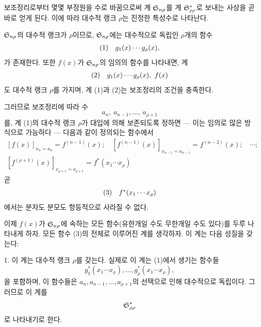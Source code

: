 보조정리로부터 몇몇 부정원을 수로 바꿈으로써 계 $\mathfrak S_{n\rho}$를 계 $\mathfrak S^*_{\rho\rho}$로 보내는 사상을 곧바로 얻게 된다. 이에 따라 대수적 랭크 $\rho$는 진정한 특성수로 나타난다.

$\mathfrak S_{n\rho}$의 대수적 랭크가 $\rho$이므로, $\mathfrak S_{n\rho}$에는 대수적으로 독립인 $\rho$개의 함수
\[
\begin{array}{@{}l@{\quad}c@{}}
(1)& g_1(x)\cdots g_\rho(x),
\end{array}
\]
가 존재한다. 또한 $f(x)$가 $\mathfrak S_{n\rho}$의 임의의 함수를 나타내면, 계
\[
\begin{array}{@{}l@{\quad}c@{}}
(2)& g_1(x)\cdots g_\rho(x),\ f(x)
\end{array}
\]
도 대수적 랭크 $\rho$를 가지며, 계 (1)과 (2)는 보조정리의 조건을 충족한다.

그러므로 보조정리에 따라 수
\[
 a_n,\ a_{n-1},\ldots,\ a_{\rho+1}
\]
를, 계 (1)의 대수적 랭크 $\rho$가 대입에 의해 보존되도록 정하면 --- 이는 임의로 많은 방식으로 가능하다 --- 다음과 같이 정의되는 함수에서
\[
\begin{array}{c}
[f(x)]_{x_n=a_n}=f^{(n-1)}(x);\quad
[f^{(n-1)}(x)]_{x_{n-1}=a_{n-1}}=f^{(n-2)}(x);\quad\cdots;\\[0.25em]
[f^{(\rho+1)}(x)]_{x_{\rho+1}=a_{\rho+1}}=f^*(x_1\cdots x_\rho)
\end{array}
\]
곧
\[
\begin{array}{@{}l@{\quad}c@{}}
(3)& f^*(x_1\cdots x_\rho)
\end{array}
\]
에서는 분자도 분모도 항등적으로 사라질 수 없다.

이제 $f(x)$가 $\mathfrak S_{n\rho}$에 속하는 모든 함수(유한개일 수도 무한개일 수도 있다)를 두루 나타내게 하자. 모든 함수 (3)의 전체로 이루어진 계를 생각하자. 이 계는 다음 성질을 갖는다:

1. 이 계는 대수적 랭크 $\rho$를 갖는다. 실제로 이 계는 (1)에서 생기는 함수들
\[
g_1^*(x_1\cdots x_\rho),\ldots,g_\rho^*(x_1\cdots x_\rho),
\]
을 포함하며, 이 함수들은 $a_n,a_{n-1},\ldots,a_{\rho+1}$의 선택으로 인해 대수적으로 독립이다. 그러므로 이 계를
\[
\mathfrak S^*_{\rho\rho}
\]
로 나타내기로 한다.

